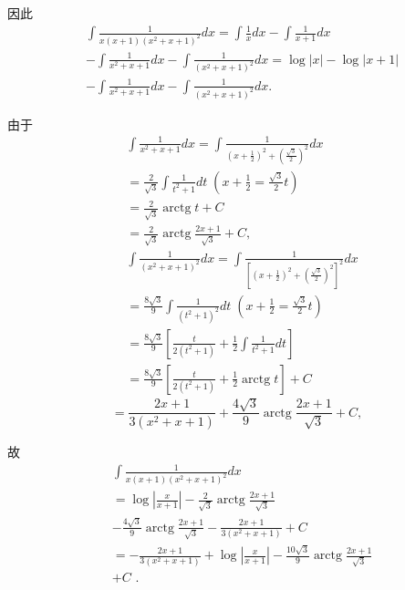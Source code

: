 因此
\begin{align*}
	&\int \frac{1}{x\left( {x + 1}\right) {\left( {x}^{2} + x + 1\right) }^{2}}{dx} = \int \frac{1}{x}{dx} - \int \frac{1}{x + 1}{dx}\\
	&- \int \frac{1}{{x}^{2} + x + 1}{dx} - \int \frac{1}{{\left( {x}^{2} + x + 1\right) }^{2}}{dx} = \log \left| x\right|  - \log \left| {x + 1}\right|\\
	&- \int \frac{1}{{x}^{2} + x + 1}{dx} - \int \frac{1}{{\left( {x}^{2} + x + 1\right) }^{2}}{dx}.
\end{align*}

由于
\begin{align*}
	&\int \frac{1}{{x}^{2} + x + 1}{dx} = \int \frac{1}{{\left( x + \frac{1}{2}\right) }^{2} + {\left( \frac{\sqrt{3}}{2}\right) }^{2}}{dx}\\
	&= \frac{2}{\sqrt{3}}\int \frac{1}{{t}^{2} + 1}{dt}\;\left( {x + \frac{1}{2} = \frac{\sqrt{3}}{2}t}\right)\\
	&= \frac{2}{\sqrt{3}}\operatorname{arctg}t + C\\
	&= \frac{2}{\sqrt{3}}\operatorname{arctg}\frac{{2x} + 1}{\sqrt{3}} + C,\\
	&\int \frac{1}{{\left( {x}^{2} + x + 1\right) }^{2}}{dx} = \int \frac{1}{{\left\lbrack  {\left( x + \frac{1}{2}\right) }^{2} + {\left( \frac{\sqrt{3}}{2}\right) }^{2}\right\rbrack  }^{2}}{dx}\\
	&= \frac{8\sqrt{3}}{9}\int \frac{1}{{\left( {t}^{2} + 1\right) }^{2}}{dt}\;\left( {x + \frac{1}{2} = \frac{\sqrt{3}}{2}t}\right)\\
	&= \frac{8\sqrt{3}}{9}\left\lbrack  {\frac{t}{2\left( {{t}^{2} + 1}\right) } + \frac{1}{2}\int \frac{1}{{t}^{2} + 1}{dt}}\right\rbrack\\
	&= \frac{8\sqrt{3}}{9}\left\lbrack  {\frac{t}{2\left( {{t}^{2} + 1}\right) } + \frac{1}{2}\operatorname{arctg}t}\right\rbrack   + C
\end{align*}
$$= \frac{{2x} + 1}{3\left( {{x}^{2} + x + 1}\right) } + \frac{4\sqrt{3}}{9}\operatorname{arctg}\frac{{2x} + 1}{\sqrt{3}} + C,$$

故
\begin{align*}
	&\int \frac{1}{x\left( {x + 1}\right) {\left( {x}^{2} + x + 1\right) }^{2}}{dx}\\
	&= \log \left| \frac{x}{x + 1}\right|  - \frac{2}{\sqrt{3}}\operatorname{arctg}\frac{{2x} + 1}{\sqrt{3}}\\
	&- \frac{4\sqrt{3}}{9}\operatorname{arctg}\frac{{2x} + 1}{\sqrt{3}} - \frac{{2x} + 1}{3\left( {{x}^{2} + x + 1}\right) } + C\\
	&=  - \frac{{2x} + 1}{3\left( {{x}^{2} + x + 1}\right) } + \log \left| \frac{x}{x + 1}\right|  - \frac{{10}\sqrt{3}}{9}\operatorname{arctg}\frac{{2x} + 1}{\sqrt{3}}\\
	&+ C\text{ . }
\end{align*}

